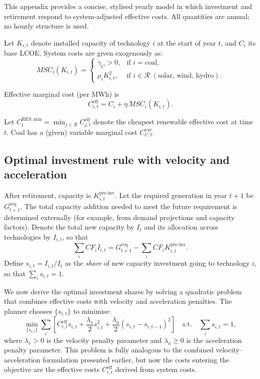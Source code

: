 \documentclass[preprint,authoryear,12pt]{elsarticle}
\begin{document}
This appendix provides a concise, stylised yearly model in which investment and retirement
respond to system-adjusted effective costs. All quantities are annual; no hourly structure is used.

Let $K_{i,t}$ denote installed capacity of technology $i$ at the start of year $t$, and $C_i$ its base
LCOE. System costs are given exogenously as:
\[
MSC_i(K_{i,t}) =
\begin{cases}
\gamma_C > 0, & \text{if } i = \text{coal},\\[3pt]
\rho_i K_{i,t}^2, & \text{if } i \in \mathcal{R} \; (\text{solar, wind, hydro}).
\end{cases}
\]

Effective marginal cost (per MWh) is
\[
C_{i,t}^{\mathrm{eff}} = C_i + \eta\, MSC_i(K_{i,t}).
\]

Let $C_{t}^{\mathrm{RES,min}} = \min_{j \in \mathcal{R}} C_{j,t}^{\mathrm{eff}}$ denote the cheapest renewable
effective cost at time $t$. Coal has a (given) variable marginal cost $C_{C,t}^{\mathrm{var}}$.


\subsection{Optimal investment rule with velocity and acceleration}

After retirement, capacity is $K_{i,t}^{\mathrm{pre\text{-}inv}}$. Let the required generation in year
$t+1$ be $G_{t+1}^{\mathrm{req}}$. The total capacity addition needed to meet the future requirement
is determined externally (for example, from demand projections and capacity factors). Denote
the total new capacity by $I_t$ and its allocation across technologies by $I_{i,t}$, so that
\[
    \sum_i CF_i I_{i,t} = G_{t+1}^{\mathrm{req}} - \sum_i CF_i K_{i,t}^{\mathrm{pre\text{-}inv}}.
\]
Define $s_{i,t} = I_{i,t} / I_t$ as the \emph{share} of new capacity investment going to technology
$i$, so that $\sum_i s_{i,t} = 1$.

We now derive the optimal investment shares by solving a quadratic problem that combines
effective costs with velocity and acceleration penalties. The planner chooses $\{s_{i,t}\}$ to
minimise:
\begin{equation}
    \min_{\{s_{i,t}\}}
    \sum_i \left[
        C_{i,t}^{\mathrm{eff}} s_{i,t}
      + \frac{\lambda_v}{2} s_{i,t}^2
      + \frac{\lambda_a}{2} (s_{i,t} - s_{i,t-1})^2
    \right]
    \quad \text{s.t.} \quad \sum_i s_{i,t} = 1,
    \label{eq:D_inv_opt_problem}
\end{equation}
where $\lambda_v > 0$ is the velocity penalty parameter and $\lambda_a \ge 0$ is the acceleration
penalty parameter. This problem is fully analogous to the combined velocity–acceleration
formulation presented earlier, but now the costs entering the objective are the effective costs
$C_{i,t}^{\mathrm{eff}}$ derived from system costs.
\end{document}
